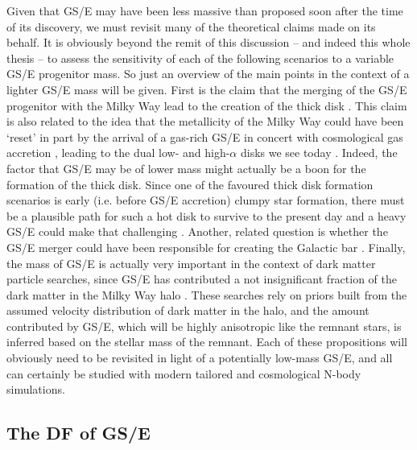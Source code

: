 Given that GS/E may have been less massive than proposed soon after the time of its discovery, we must revisit many of the theoretical claims made on its behalf. It is obviously beyond the remit of this discussion -- and indeed this whole thesis -- to assess the sensitivity of each of the following scenarios to a variable GS/E progenitor mass. So just an overview of the main points in the context of a lighter GS/E mass will be given. First is the claim that the merging of the GS/E progenitor with the Milky Way lead to the creation of the thick disk \parencite[e.g.][]{helmi18,gallart19}. This claim is also related to the idea that the metallicity of the Milky Way could have been `reset' in part by the arrival of a gas-rich GS/E in concert with cosmological gas accretion \parencite[e.g.][]{grand20,renaud21,ciuca24}, leading to the dual low- and high-$\alpha$ disks we see today \parencite[see also the two-infall model][]{chiappini97}. Indeed, the factor that GS/E may be of lower mass might actually be a boon for the formation of the thick disk. Since one of the favoured thick disk formation scenarios is early (i.e. before GS/E accretion) clumpy star formation, there must be a plausible path for such a hot disk to survive to the present day and a heavy GS/E could make that challenging \parencite[see e.g. arguments for this in][]{deason24}. Another, related question is whether the GS/E merger could have been responsible for creating the Galactic bar \parencite{merrow23}. Finally, the mass of GS/E is actually very important in the context of dark matter particle searches, since GS/E has contributed a not insignificant fraction of the dark matter in the Milky Way halo \parencite{necib19,evans19}. These searches rely on priors built from the assumed velocity distribution of dark matter in the halo, and the amount contributed by GS/E, which will be highly anisotropic like the remnant stars, is inferred based on the stellar mass of the remnant. Each of these propositions will obviously need to be revisited in light of a potentially low-mass GS/E, and all can certainly be studied with modern tailored and cosmological N-body simulations. 

\subsection{The DF of GS/E}

